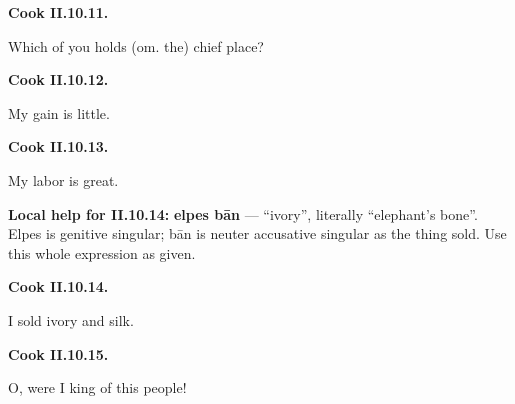 \par\begin{minipage}{\linewidth}\raggedright
\textbf{Cook II.10.11.}

Which of you holds (om. the) chief place?

\end{minipage}\par\addvspace{4pt}

\par\begin{minipage}{\linewidth}\raggedright
\textbf{Cook II.10.12.}

My gain is little.

\end{minipage}\par\addvspace{4pt}

\par\begin{minipage}{\linewidth}\raggedright
\textbf{Cook II.10.13.}

My labor is great.

\end{minipage}\par\addvspace{4pt}

\textbf{Local help for II.10.14:} \textbf{elpes bān} — “ivory”, literally “elephant’s bone”. Elpes is genitive singular; bān is neuter accusative singular as the thing sold. Use this whole expression as given.

\par\begin{minipage}{\linewidth}\raggedright
\textbf{Cook II.10.14.}

I sold ivory and silk.

\end{minipage}\par\addvspace{4pt}

\par\begin{minipage}{\linewidth}\raggedright
\textbf{Cook II.10.15.}

O, were I king of this people!

\end{minipage}\par\addvspace{4pt}

